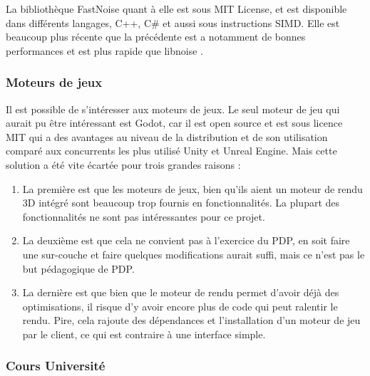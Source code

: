 \documentclass[a4paper]{article}
\begin{document}
    
    La bibliothèque FastNoise quant à elle est sous MIT License, et est disponible dans différents langages, C++, C\# et aussi sous instructions SIMD. Elle est beaucoup plus récente que la précédente est a notamment de bonnes performances et est plus rapide que libnoise \protect\footnotemark.\\
    
    
 \subsubsection{Moteurs de jeux}

    Il est possible de s'intéresser aux moteurs de jeux. Le seul moteur de jeu qui aurait pu être intéressant est Godot, car il est open source et est sous licence MIT qui a des avantages au niveau de la distribution et de son utilisation comparé aux concurrents les plus utilisé Unity et Unreal Engine. Mais cette solution a été vite écartée pour trois grandes raisons : 
    \begin{enumerate}
        \item  La première est que les moteurs de jeux, bien qu'ils aient un moteur de rendu 3D intégré sont beaucoup trop fournis en fonctionnalités. La plupart des fonctionnalités ne sont pas intéressantes pour ce projet. 
        
        \item La deuxième est que cela ne convient pas à l'exercice du PDP, en soit faire une sur-couche et faire quelques modifications aurait suffi, mais ce n'est pas le but pédagogique de PDP.
        
        \item  La dernière est que bien que le moteur de rendu permet d'avoir déjà des optimisations, il risque d'y avoir encore plus de code qui peut ralentir le rendu. Pire, cela rajoute des dépendances et l'installation d'un moteur de jeu par le client, ce qui est contraire à une interface simple.
    \end{enumerate}

 \subsubsection{Cours Université}
    
\end{document}

